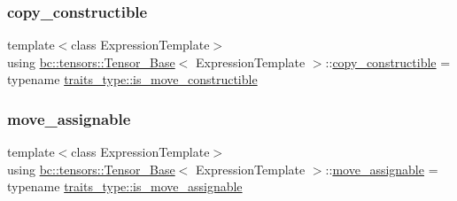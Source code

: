 \mbox{\label{classbc_1_1tensors_1_1Tensor__Base_a08d8e4ba8980b44e1a3cf169a9c014b4}} 
\subsubsection{\texorpdfstring{copy\+\_\+constructible}{copy\_constructible}}
{\footnotesize\ttfamily template$<$class Expression\+Template$>$ \\
using \hyperlink{classbc_1_1tensors_1_1Tensor__Base}{bc\+::tensors\+::\+Tensor\+\_\+\+Base}$<$ Expression\+Template $>$\+::\hyperlink{classbc_1_1tensors_1_1Tensor__Base_a08d8e4ba8980b44e1a3cf169a9c014b4}{copy\+\_\+constructible} =  typename \hyperlink{structbc_1_1tensors_1_1exprs_1_1expression__traits_a79f84851dcb50d4b56daa25301a3f9fb}{traits\+\_\+type\+::is\+\_\+move\+\_\+constructible}}

\mbox{\label{classbc_1_1tensors_1_1Tensor__Base_ac337cf3053ee0fde4b954d99496598f2}} 
\subsubsection{\texorpdfstring{move\+\_\+assignable}{move\_assignable}}
{\footnotesize\ttfamily template$<$class Expression\+Template$>$ \\
using \hyperlink{classbc_1_1tensors_1_1Tensor__Base}{bc\+::tensors\+::\+Tensor\+\_\+\+Base}$<$ Expression\+Template $>$\+::\hyperlink{classbc_1_1tensors_1_1Tensor__Base_ac337cf3053ee0fde4b954d99496598f2}{move\+\_\+assignable} =  typename \hyperlink{structbc_1_1tensors_1_1exprs_1_1expression__traits_ae32e2d333f9a7eed4baee44455cf7b46}{traits\+\_\+type\+::is\+\_\+move\+\_\+assignable}}

\mbox{\label{classbc_1_1tensors_1_1Tensor__Base_a705cd4c3c18056c0633bd5dd7a2b6691}} 

